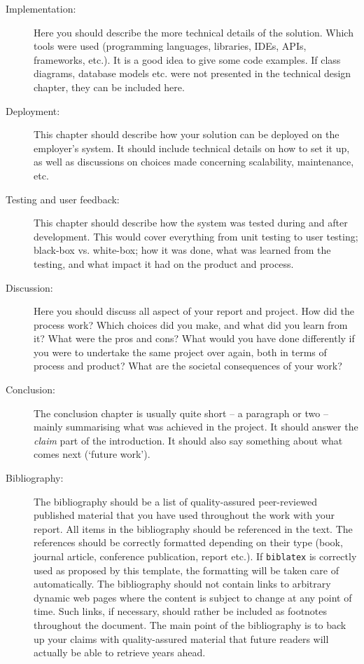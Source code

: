 \begin{description}
    \item[Implementation:] Here you should describe the more technical details of the solution. Which tools were used (programming languages, libraries, IDEs, APIs, frameworks, etc.). It is a good idea to give some code examples. If class diagrams, database models etc. were not presented in the technical design chapter, they can be included here.
    \item[Deployment:] This chapter should describe how your solution can be deployed on the employer's system. It should include technical details on how to set it up, as well as discussions on choices made concerning scalability, maintenance, etc.
    \item[Testing and user feedback:] This chapter should describe how the system was tested during and after development. This would cover everything from unit testing to user testing; black-box vs. white-box; how it was done, what was learned from the testing, and what impact it had on the product and process.
    \item[Discussion:] Here you should discuss all aspect of your report and project. How did the process work? Which choices did you make, and what did you learn from it? What were the pros and cons? What would you have done differently if you were to undertake the same project over again, both in terms of process and product? What are the societal consequences of your work?
    \item[Conclusion:] The conclusion chapter is usually quite short – a paragraph or two – mainly summarising what was achieved in the project. It should answer the \emph{claim} part of the introduction. It should also say something about what comes next (`future work').
    \item[Bibliography:] The bibliography should be a list of quality-assured peer-reviewed published material that you have used throughout the work with your report. All items in the bibliography should be referenced in the text. The references should be correctly formatted depending on their type (book, journal article, conference publication, report etc.). If \texttt{biblatex} is correctly used as proposed by this template, the formatting will be taken care of automatically. The bibliography should not contain links to arbitrary dynamic web pages where the content is subject to change at any point of time. Such links, if necessary, should rather be included as footnotes throughout the document. The main point of the bibliography is to back up your claims with quality-assured material that future readers will actually be able to retrieve years ahead.
\end{description}

